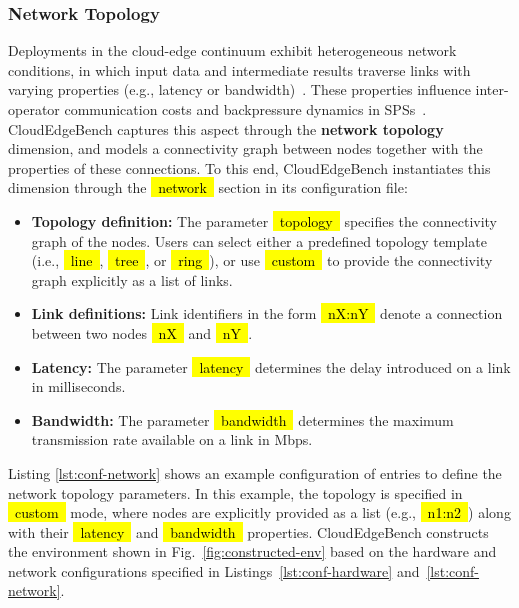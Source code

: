 \documentclass[runningheads]{llncs}
\newcommand*{\codebox}[1]{{\ttfamily\hyphenchar\font=45\relax\hl{~#1~}}}
\begin{document}
\subsubsection{Network Topology}
Deployments in the cloud-edge continuum exhibit heterogeneous network conditions, in which input data and intermediate results traverse links with varying properties (e.g., latency or bandwidth)~\cite{iec-survey-25}.
These properties influence inter-operator communication costs and backpressure dynamics in SPSs~\cite{sec-survey}.
CloudEdgeBench captures this aspect through the \textbf{network topology} dimension, and models a connectivity graph between nodes together with the properties of these connections.
To this end, CloudEdgeBench instantiates this dimension through the \codebox{network} section in its configuration file:
\begin{itemize}
    \item \textbf{Topology definition:} The parameter \codebox{topology} specifies the connectivity graph of the nodes.
Users can select either a predefined topology template (i.e., \codebox{line}, \codebox{tree}, or \codebox{ring}), or use \codebox{custom} to provide the connectivity graph explicitly as a list of links.
    \item \textbf{Link definitions:} Link identifiers in the form \codebox{nX:nY} denote a connection between two nodes \codebox{nX} and \codebox{nY}.
    \item \textbf{Latency:} The parameter \codebox{latency} determines the delay introduced on a link in milliseconds.
    \item \textbf{Bandwidth:} The parameter \codebox{bandwidth} determines the maximum transmission rate available on a link in Mbps.
    \end{itemize}
Listing \ref{lst:conf-network} shows an example configuration of entries to define the network topology parameters.
In this example, the topology is specified in \codebox{custom} mode, where nodes are explicitly provided as a list (e.g., \codebox{n1:n2}) along with their \codebox{latency} and \codebox{bandwidth} properties.
CloudEdgeBench constructs the environment shown in Fig.~\ref{fig:constructed-env} based on the hardware and network configurations specified in Listings~\ref{lst:conf-hardware} and~\ref{lst:conf-network}.
\end{document}
